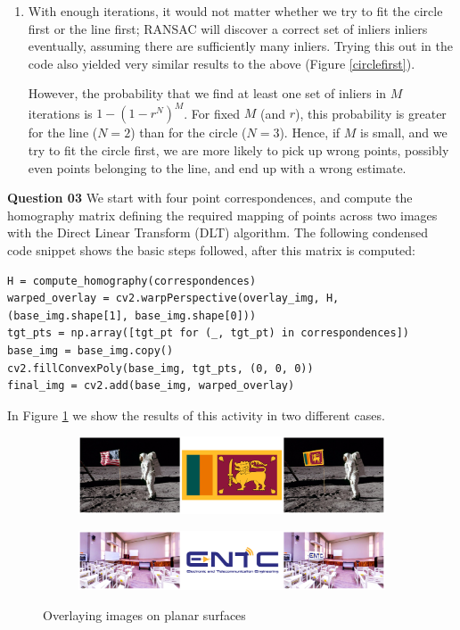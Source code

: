 \documentclass{article}[a4paper]
\begin{document}
\begin{enumerate}
		\item With enough iterations, it would not matter whether we try to fit the circle first or the line first; RANSAC will discover a correct set of inliers inliers eventually, assuming there are sufficiently many inliers. Trying this out in the code also yielded very similar results to the above (Figure \ref{circlefirst}).
		
		However, the probability that we find at least one set of inliers in $M$ iterations is $1 - \left(1 - r^N\right)^M$. For fixed $M$ (and $r$), this probability is greater for the line ($N=2$) than for the circle ($N=3$). Hence, if $M$ is small, and we try to fit the circle first, we are more likely to pick up wrong points, possibly even points belonging to the line, and end up with a wrong estimate.
	\end{enumerate}
    
    \textbf{Question 03} We start with four point correspondences, and compute the homography matrix defining the required mapping of points across two images with the Direct Linear Transform (DLT) algorithm. The following condensed code snippet shows the basic steps followed, after this matrix is computed:
	\begin{lstlisting}
H = compute_homography(correspondences)
warped_overlay = cv2.warpPerspective(overlay_img, H, (base_img.shape[1], base_img.shape[0]))
tgt_pts = np.array([tgt_pt for (_, tgt_pt) in correspondences])
base_img = base_img.copy()
cv2.fillConvexPoly(base_img, tgt_pts, (0, 0, 0))
final_img = cv2.add(base_img, warped_overlay)
	\end{lstlisting}

	In Figure \ref{q3} we show the results of this activity in two different cases.

	\begin{figure}[H]
		\centering
		\begin{subfigure}{\textwidth}
			\centering
			\includegraphics[width=\textwidth]{imgs/q31.png}
		\end{subfigure}
		\begin{subfigure}{\textwidth}
			\centering
			\includegraphics[width=\textwidth]{imgs/q32.png}
		\end{subfigure}
		\caption{Overlaying images on planar surfaces}
		\label{q3}
	\end{figure}
\end{document}
